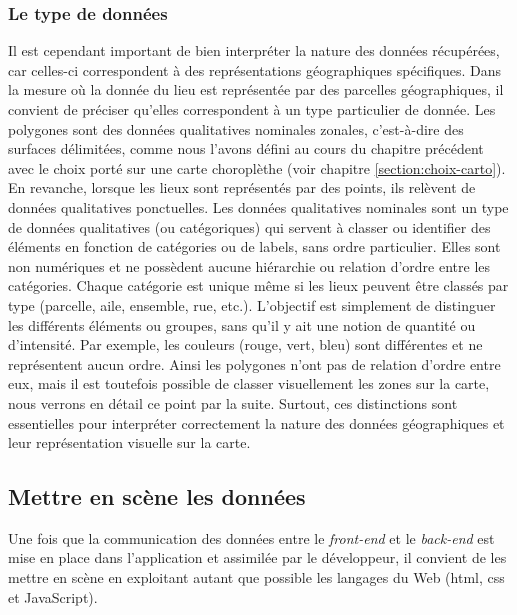 \subsubsection{Le type de données}
Il est cependant important de bien interpréter la nature des données récupérées, car celles-ci correspondent à des représentations géographiques spécifiques. Dans la mesure où la donnée du lieu est représentée par des parcelles géographiques, il convient de préciser qu'elles correspondent à un type particulier de donnée. Les polygones sont des données qualitatives nominales zonales, c'est-à-dire des surfaces délimitées, comme nous l'avons défini au cours du chapitre précédent avec le choix porté sur une carte choroplèthe (voir chapitre \ref{section:choix-carto}). En revanche, lorsque les lieux sont représentés par des points, ils relèvent de données qualitatives ponctuelles. Les données qualitatives nominales sont un type de données qualitatives (ou catégoriques) qui servent à classer ou identifier des éléments en fonction de catégories ou de labels, sans ordre particulier. Elles sont non numériques et ne possèdent aucune hiérarchie ou relation d'ordre entre les catégories. Chaque catégorie est unique même si les lieux peuvent être classés par type (parcelle, aile, ensemble, rue, etc.). L'objectif est simplement de distinguer les différents éléments ou groupes, sans qu'il y ait une notion de quantité ou d'intensité. Par exemple, les couleurs (rouge, vert, bleu) sont différentes et ne représentent aucun ordre. Ainsi les polygones n'ont pas de relation d'ordre entre eux, mais il est toutefois possible de classer visuellement les zones sur la carte, nous verrons en détail ce point par la suite. Surtout, ces distinctions sont essentielles pour interpréter correctement la nature des données géographiques et leur représentation visuelle sur la carte. 

\subsection{Mettre en scène les données}
Une fois que la communication des données entre le \textit{front-end} et le \textit{back-end } est mise en place dans l'application et assimilée par le développeur, il convient de les mettre en scène en exploitant autant que possible les langages du Web (\acrshort{html}, \acrshort{css} et JavaScript).
